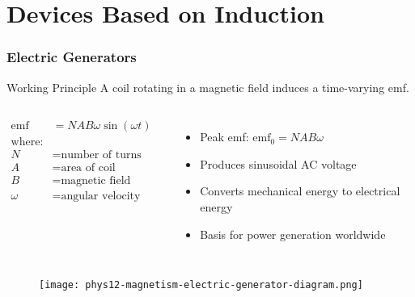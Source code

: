 \documentclass{beamer}
\begin{document}
\section{Devices Based on Induction}

\begin{frame}
\frametitle{Electric Generators}
\begin{block}{Working Principle}
A coil rotating in a magnetic field induces a time-varying emf.
\end{block}

\begin{columns}
\begin{align}
\text{emf} &= NAB\omega\sin(\omega t) \\
\text{where:} \\
N &= \text{number of turns} \\
A &= \text{area of coil} \\
B &= \text{magnetic field strength} \\
\omega &= \text{angular velocity}
\end{align}

\begin{itemize}
\item Peak emf: $\text{emf}_0 = NAB\omega$
\item Produces sinusoidal AC voltage
\item Converts mechanical energy to electrical energy
\item Basis for power generation worldwide
\end{itemize}
\end{columns}

\end{frame}

\begin{frame}
\begin{figure}
    \centering
    \texttt{[image: phys12-magnetism-electric-generator-diagram.png]}
\end{figure}
\end{frame}
\end{document}

